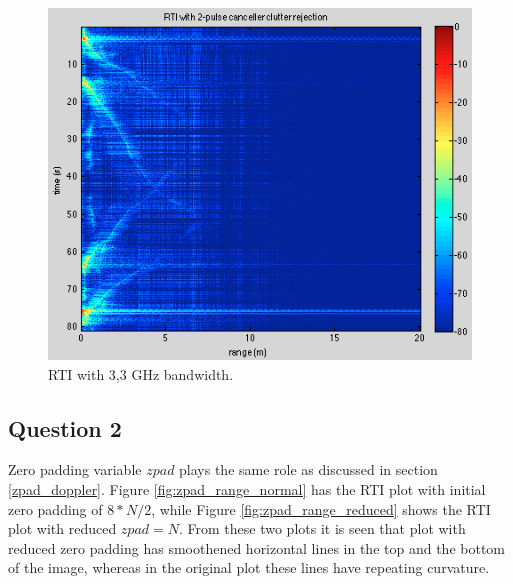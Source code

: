 \documentclass{article}
\begin{document}
\begin{figure}[ht]
\begin{minipage}[b]{0.33\linewidth}
\centering
\includegraphics[width=\textwidth]{Figures/bw_increased.png}
\caption{RTI with 3,3 GHz bandwidth.}
\label{fig:bw_increased}
\end{minipage}
\end{figure}

\subsection{Question 2}

Zero padding variable $zpad$ plays the same role as discussed in section \ref{zpad_doppler}. Figure \ref{fig:zpad_range_normal} has the RTI plot with initial zero padding of $8*N/2$, while Figure \ref{fig:zpad_range_reduced} shows the RTI plot with reduced $zpad = N$. From these two plots it is seen that plot with reduced zero padding has smoothened horizontal lines in the top and the bottom of the image, whereas in the original plot these lines have repeating curvature.
\end{document}

